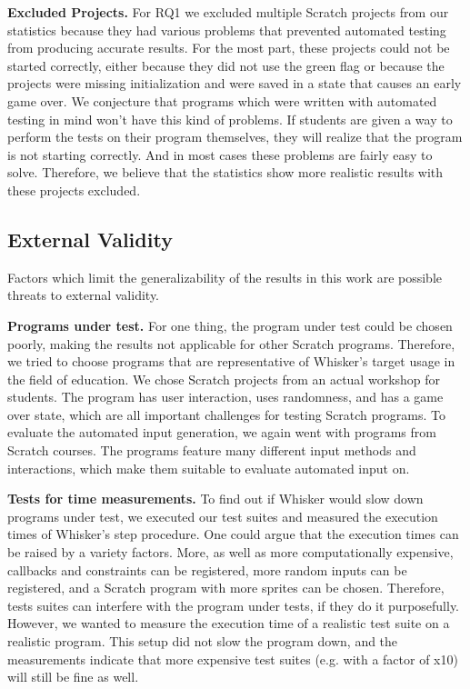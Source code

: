 \textbf{Excluded Projects.}
For RQ1 we excluded multiple Scratch projects from our statistics because they had various problems that
prevented automated testing from producing accurate results.
For the most part, these projects could not be started correctly,
either because they did not use the green flag or because the projects were missing initialization and were
saved in a state that causes an early game over.
We conjecture that programs which were written with automated testing in mind won't have this kind of problems.
If students are given a way to perform the tests on their program themselves, they will realize that the program is not starting correctly.
And in most cases these problems are fairly easy to solve.
Therefore, we believe that the statistics show more realistic results with these projects excluded.

\subsection{External Validity}

Factors which limit the generalizability of the results in this work are possible threats to external validity.
\parspace

\textbf{Programs under test.} For one thing, the program under test could be chosen poorly,
making the results not applicable for other Scratch programs.
Therefore, we tried to choose programs that are representative of Whisker's target usage in the field of education.
We chose Scratch projects from an actual workshop for students.
The program has user interaction, uses randomness, and has a game over state,
which are all important challenges for testing Scratch programs.
To evaluate the automated input generation,
we again went with programs from Scratch courses.
The programs feature many different input methods and interactions,
which make them suitable to evaluate automated input on.
\parspace

\textbf{Tests for time measurements.}
To find out if Whisker would slow down programs under test,
we executed our test suites and measured the execution times of Whisker's step procedure.
One could argue that the execution times can be raised by a variety factors.
More, as well as more computationally expensive, callbacks and constraints can be registered,
more random inputs can be registered,
and a Scratch program with more sprites can be chosen.
Therefore, tests suites can interfere with the program under tests, if they do it purposefully.
However, we wanted to measure the execution time of a realistic test suite on a realistic program.
This setup did not slow the program down,
and the measurements indicate that more expensive test suites (e.g. with a factor of x10) will still be fine as well.
%
